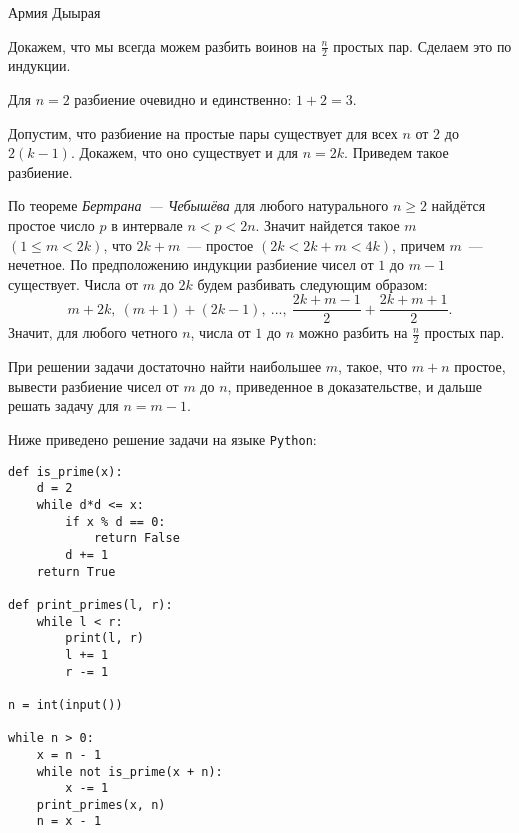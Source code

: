 \begin{tutorial}{Армия Дыырая}

Докажем, что мы всегда можем разбить воинов на $\displaystyle \frac{n}{2}$ простых пар. Сделаем это по индукции.

Для $n = 2$ разбиение очевидно и единственно: $1 + 2 = 3$.

Допустим, что разбиение на простые пары существует для всех $n$ от $2$ до $2(k-1)$. Докажем,  что оно существует и для $n=2k$. Приведем такое разбиение.

По теореме \textit{Бертрана~--- Чебышёва} для любого натурального $n \ge 2$ найдётся простое число $p$ в интервале $n < p < 2n$. Значит найдется такое $m$ $(1 \le m < 2k)$, что $2k + m$~--- простое $(2k < 2k + m < 4k)$, причем $m$~--- нечетное. По предположению индукции разбиение чисел от $1$ до $m-1$ существует. Числа от $m$ до $2k$ будем разбивать следующим образом: 
$$m + 2k,~(m+1) + (2k-1),~...,~\frac{2k + m-1}{2} + \frac{2k + m+1}{2}.$$
Значит, для любого четного $n$, числа от $1$ до $n$ можно разбить на $\displaystyle \frac{n}{2}$ простых пар.

При решении задачи достаточно найти наибольшее $m$, такое, что $m + n$ простое, вывести разбиение чисел от $m$ до $n$, приведенное в доказательстве, и дальше решать задачу для $n = m-1$.

Ниже приведено решение задачи на языке \texttt{Python}:
\begin{verbatim}
def is_prime(x):
    d = 2
    while d*d <= x:
        if x % d == 0:
            return False
        d += 1
    return True

def print_primes(l, r):
    while l < r:
        print(l, r)
        l += 1
        r -= 1

n = int(input())

while n > 0:
    x = n - 1
    while not is_prime(x + n):
        x -= 1
    print_primes(x, n)
    n = x - 1
\end{verbatim}

\end{tutorial}
